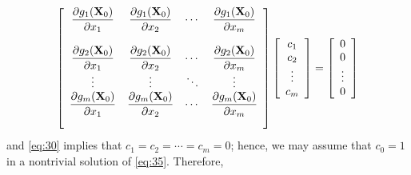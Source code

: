 \documentclass{article}
\newcommand{\dst}{\displaystyle}
\begin{document}
$$
\left[\begin{array}{ccccccc}
\dst{\frac{\partial{g_{1}({\bf X}_{0})}}{\partial{x_{1}}}}&
\dst{\frac{\partial{g_{1}({\bf X}_{0})}}{\partial{x_{2}}}}&
\cdots&
\dst{\frac{\partial{g_{1}({\bf X}_{0})}}{\partial{x_{m}}}}\\ \\
\dst{\frac{\partial{g_{2}({\bf X}_{0})}}{\partial{x_{1}}}}&
\dst{\frac{\partial{g_{2}({\bf X}_{0})}}{\partial{x_{2}}}}&
\cdots&
\dst{\frac{\partial{g_{2}({\bf X}_{0})}}{\partial{x_{m}}}}\\
\vdots&\vdots&\ddots&\vdots\\
\dst{\frac{\partial{g_{m}({\bf X}_{0})}}{\partial{x_{1}}}}&
\dst{\frac{\partial{g_{m}({\bf X}_{0})}}{\partial{x_{2}}}}&
\cdots&
\dst{\frac{\partial{g_{m}({\bf X}_{0})}}{\partial{x_{m}}}}\\ \\
\end{array}\right]
\left[\begin{array}{ccccccc}
c_{1}\\c_{2}\\\vdots\\c_{m}
\end{array}\right]=
\left[\begin{array}{ccccccc}
0\\0\\\vdots\\0
\end{array}\right]
$$
and \eqref{eq:30} implies that $c_{1}=c_{2}=\cdots = c_{m}=0$; hence, we
may assume that $c_{0}=1$ in a nontrivial solution of \eqref{eq:35}.
Therefore,
\end{document}
